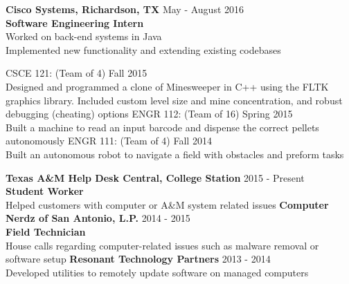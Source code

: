 \documentclass[12pt]{article}
\begin{document}
\begin{flushleft}
\begin{outline}[compactitem]
  \1 \textbf{Cisco Systems, Richardson, TX} \hfill May - August 2016
  \\ \textbf{Software Engineering Intern}
  \\ Worked on back-end systems in Java
  \\ Implemented new functionality and extending existing codebases

  \1 CSCE 121:  (Team of 4) \hfill Fall 2015 
    \\ Designed and programmed a clone of Minesweeper in C++ using the FLTK graphics library. Included custom level size and mine concentration, and robust debugging (cheating) options
  \1 ENGR 112: (Team of 16) \hfill Spring 2015
    \\ Built a machine to read an input barcode and dispense the correct pellets autonomously 
  \1 ENGR 111: (Team of 4) \hfill Fall 2014
    \\ Built an autonomous robot to navigate a field with obstacles and preform tasks

  \1 \textbf{Texas A\&M Help Desk Central, College Station} \hfill 2015 - Present
    \\ \textbf{Student Worker}
    \\ Helped customers with computer or A\&M system related issues
  \1 \textbf{Computer Nerdz of San Antonio, L.P.} \hfill 2014 - 2015
    \\ \textbf{Field Technician}
    \\ House calls regarding computer-related issues such as malware removal or software setup
  \1 \textbf{Resonant Technology Partners} \hfill 2013 - 2014
    \\ Developed utilities to remotely update software on managed computers


\end{outline}
\end{flushleft}
\end{document}
